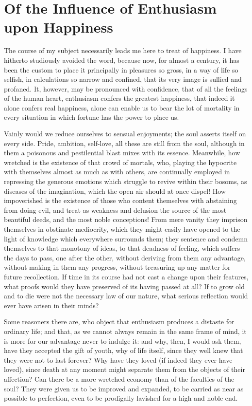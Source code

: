 
\author{Madame de Sta\"{e}l}
\chapter{Of the Influence of Enthusiasm upon Happiness}

The course of my subject necessarily leads me here to treat
of happiness. I have hitherto studiously avoided the word, because
now, for almost a century, it has been the custom to place it
principally in pleasures so gross, in a way of life so selfish, in
calculations so narrow and confined, that its very image is sullied
and profaned. It, however, may be pronounced with confidence, that of
all the feelings of the human heart, enthusiasm confers the greatest
happiness, that indeed it alone confers real happiness, alone can
enable us to bear the lot of mortality in every situation in which
fortune has the power to place us.

Vainly would we reduce ourselves to sensual enjoyments; the soul
asserts itself on every side. Pride, ambition, self-love, all these
are still from the soul, although in them a poisonous  and
pestilential blast mixes with its essence. Meanwhile, how wretched is
the existence of that crowd of mortals, who, playing the hypocrite
with themselves almost as much as with others, are continually
employed in repressing the generous emotions which struggle to revive
within their bosoms, as diseases of the imagination, which the open
air should at once dispel! How impoverished is the existence of those
who content themselves with abstaining from doing evil, and treat as
weakness and delusion the source of the most beautiful deeds, and the
most noble conceptions! From mere vanity they imprison themselves in
obstinate mediocrity, which they might easily have opened to the light
of knowledge which everywhere surrounds them; they sentence and
condemn themselves to that monotony of ideas, to that deadness of
feeling, which suffers the days to pass, one after the other, without
deriving from them any advantage, without making in them any progress,
without treasuring up any matter for future recollection. If time in
its course had not cast a change upon their features, what proofs
would they have preserved of its having passed at all? If to grow old
and to die were not the necessary law of our nature, what serious
reflection would ever have arisen in their minds?

Some reasoners there are, who object that enthusiasm produces a
distaste for ordinary life; and that, as we cannot always remain in
the same frame of mind, it is more for our advantage never to indulge
it: and why, then, I would ask them, have they accepted the gift of
youth, why of life itself, since they well knew that they were not to
last forever? Why have they loved (if indeed they ever have loved),
since death at any moment might separate them from the objects of
their affection? Can there be a more wretched economy than of the
faculties of the soul? They were given us to be improved and expanded,
to be carried as near as possible to perfection, even to be prodigally
lavished for a high and noble end.

